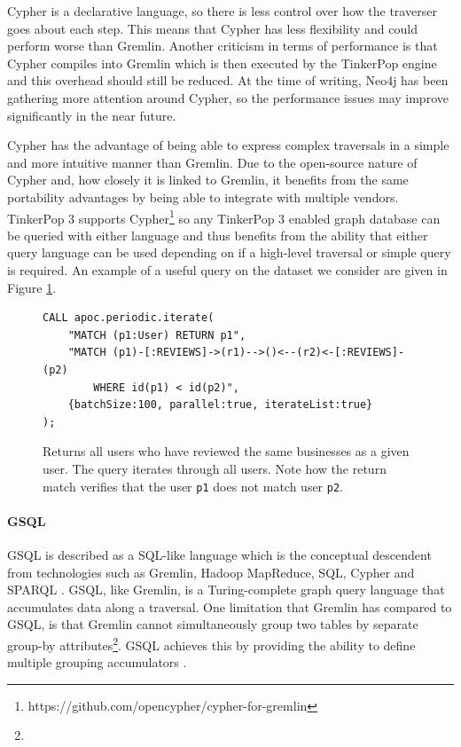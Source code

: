 Cypher is a declarative language, so there is less control over how the traverser goes about each step. This means that Cypher has less flexibility and could perform worse than Gremlin. Another criticism in terms of performance is that Cypher compiles into Gremlin which is then executed by the TinkerPop engine \cite{backtothefuture} and this overhead should still be reduced. At the time of writing, Neo4j has been gathering more attention around Cypher, so the performance issues may improve significantly in the near future.

Cypher has the advantage of being able to express complex traversals in a simple and more intuitive manner than Gremlin. Due to the open-source nature of Cypher and, how closely it is linked to Gremlin, it benefits from the same portability advantages by being able to integrate with multiple vendors. TinkerPop 3 supports Cypher\footnote{https://github.com/opencypher/cypher-for-gremlin} so any TinkerPop 3 enabled graph database can be queried with either language and thus benefits from the ability that either query language can be used depending on if a high-level traversal or simple query is required. An example of a useful query on the dataset we consider are given in Figure \ref{lst:cypher-example-1}.

\begin{figure}[h]
    \centering
    \begin{lstlisting}[language=cypher]
CALL apoc.periodic.iterate(
    "MATCH (p1:User) RETURN p1",
    "MATCH (p1)-[:REVIEWS]->(r1)-->()<--(r2)<-[:REVIEWS]-(p2)
        WHERE id(p1) < id(p2)",
    {batchSize:100, parallel:true, iterateList:true}
);
    \end{lstlisting}
    \caption{Returns all users who have reviewed the same businesses as a given user. The query iterates through all users. Note how the return match verifies that the user \texttt{p1} does not match user \texttt{p2}.}
    \label{lst:cypher-example-1}
\end{figure}

\paragraph{GSQL}

GSQL is described as a SQL-like language which is the conceptual descendent from technologies such as Gremlin, Hadoop MapReduce, SQL, Cypher and SPARQL \cite{gsql-tigergraph}. GSQL, like Gremlin, is a Turing-complete graph query language that accumulates data along a traversal. One limitation that Gremlin has compared to GSQL, is that Gremlin cannot simultaneously group two tables by separate group-by attributes\footnote{}. GSQL achieves this by providing the ability to define multiple grouping accumulators .

